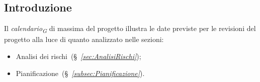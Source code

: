 \subsection{Introduzione}
Il \textit{calendario}\textsubscript{\textit{G}} di massima del progetto illustra le date previste per le revisioni del progetto
alla luce di quanto analizzato nelle sezioni: 
\begin{itemize}
    \item Analisi dei rischi~(\S~\textit{\ref{sec:AnalisiRischi}});
    \item Pianificazione~(\S~\textit{\ref{subsec:Pianificazione}}).
\end{itemize}